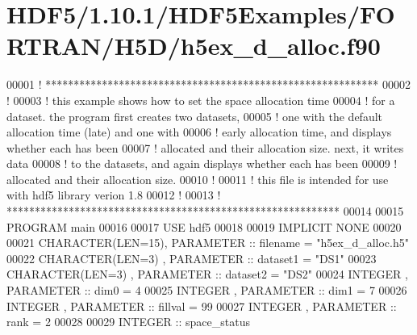 \hypertarget{_h_d_f5_21_810_81_2_h_d_f5_examples_2_f_o_r_t_r_a_n_2_h5_d_2h5ex__d__alloc_8f90_source}{}\section{H\+D\+F5/1.10.1/\+H\+D\+F5\+Examples/\+F\+O\+R\+T\+R\+A\+N/\+H5\+D/h5ex\+\_\+d\+\_\+alloc.f90}
\label{_h_d_f5_21_810_81_2_h_d_f5_examples_2_f_o_r_t_r_a_n_2_h5_d_2h5ex__d__alloc_8f90_source}

\begin{DoxyCode}
00001 \textcolor{comment}{! ***********************************************************}
00002 \textcolor{comment}{!}
00003 \textcolor{comment}{!  this example shows how to set the space allocation time}
00004 \textcolor{comment}{!  for a dataset.  the program first creates two datasets,}
00005 \textcolor{comment}{!  one with the default allocation time (late) and one with}
00006 \textcolor{comment}{!  early allocation time, and displays whether each has been}
00007 \textcolor{comment}{!  allocated and their allocation size.  next, it writes data}
00008 \textcolor{comment}{!  to the datasets, and again displays whether each has been}
00009 \textcolor{comment}{!  allocated and their allocation size.}
00010 \textcolor{comment}{!}
00011 \textcolor{comment}{!  this file is intended for use with hdf5 library verion 1.8}
00012 \textcolor{comment}{!}
00013 \textcolor{comment}{! ***********************************************************}
00014 
00015 \textcolor{keyword}{PROGRAM} main
00016 
00017   \textcolor{keywordtype}{USE }hdf5
00018 
00019   \textcolor{keywordtype}{IMPLICIT NONE}
00020 
00021   \textcolor{keywordtype}{CHARACTER(LEN=15)}, \textcolor{keywordtype}{PARAMETER} :: filename = \textcolor{stringliteral}{"h5ex\_d\_alloc.h5"}
00022   \textcolor{keywordtype}{CHARACTER(LEN=3)} , \textcolor{keywordtype}{PARAMETER} :: dataset1 = \textcolor{stringliteral}{"DS1"}
00023   \textcolor{keywordtype}{CHARACTER(LEN=3)} , \textcolor{keywordtype}{PARAMETER} :: dataset2 = \textcolor{stringliteral}{"DS2"}
00024   \textcolor{keywordtype}{INTEGER}          , \textcolor{keywordtype}{PARAMETER} :: dim0     = 4
00025   \textcolor{keywordtype}{INTEGER}          , \textcolor{keywordtype}{PARAMETER} :: dim1     = 7
00026   \textcolor{keywordtype}{INTEGER}          , \textcolor{keywordtype}{PARAMETER} :: fillval  = 99
00027   \textcolor{keywordtype}{INTEGER}          , \textcolor{keywordtype}{PARAMETER} :: rank     = 2
00028 
00029   \textcolor{keywordtype}{INTEGER} :: space\_status

\end{DoxyCode}
